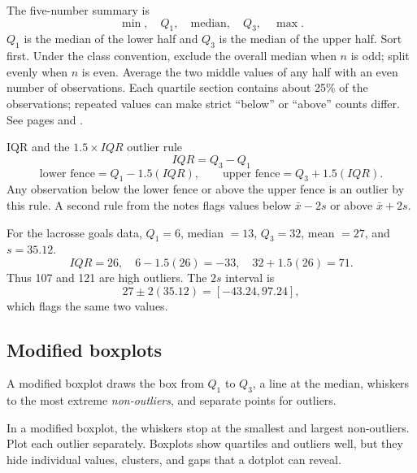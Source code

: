 \documentclass[11pt]{article}
\begin{document}
The five-number summary is
\[
\min,\quad Q_1,\quad \text{median},\quad Q_3,\quad \max.
\]
$Q_1$ is the median of the lower half and $Q_3$ is the median of the upper half. Sort first. Under the class convention, exclude the overall median when $n$ is odd; split evenly when $n$ is even. Average the two middle values of any half with an even number of observations. Each quartile section contains about 25\% of the observations; repeated values can make strict ``below'' or ``above'' counts differ. See pages \pageref{review:histogram} and \pageref{review:absences}.

\begin{formulabox}{IQR and the $1.5\times IQR$ outlier rule}
\[
IQR=Q_3-Q_1
\]
\[
\text{lower fence}=Q_1-1.5(IQR),\qquad
\text{upper fence}=Q_3+1.5(IQR).
\]
Any observation below the lower fence or above the upper fence is an outlier by this rule. A second rule from the notes flags values below $\bar{x}-2s$ or above $\bar{x}+2s$.
\end{formulabox}

For the lacrosse goals data, $Q_1=6$, median $=13$, $Q_3=32$, mean $=27$, and $s=35.12$.
\[
IQR=26,\quad 6-1.5(26)=-33,\quad 32+1.5(26)=71.
\]
Thus 107 and 121 are high outliers. The $2s$ interval is
\[
27\pm2(35.12)=[-43.24,97.24],
\]
which flags the same two values.

\subsection{Modified boxplots}

A modified boxplot draws the box from $Q_1$ to $Q_3$, a line at the median, whiskers to the most extreme \emph{non-outliers}, and separate points for outliers.

\begin{center}
\end{center}

\begin{trapbox}
In a modified boxplot, the whiskers stop at the smallest and largest non-outliers. Plot each outlier separately. Boxplots show quartiles and outliers well, but they hide individual values, clusters, and gaps that a dotplot can reveal.
\end{trapbox}
\end{document}
